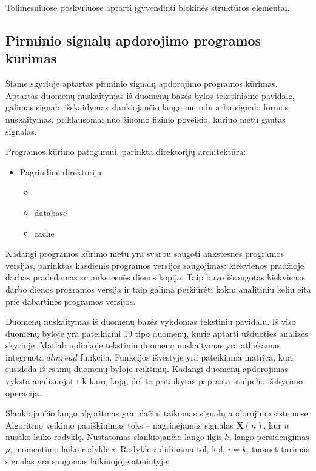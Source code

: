 \documentclass[]{vgtuef}
\begin{document}
Tolimesniuose poskyriuose aptarti įgyvendinti blokinės struktūros elementai.

\subsection{Pirminio signalų apdorojimo programos kūrimas}

Šiame skyriuje aptartas pirminio signalų apdorojimo programos kūrimas. Aptartas duomenų nuskaitymas iš duomenų bazės bylos tekstiniame pavidale, galimas signalo išskaidymas slankiojančio lango metodu arba signalo formos nuskaitymas, priklausomai nuo žinomo fizinio poveikio, kuriuo metu gautas signalas.

Programos kūrimo patogumui, parinkta direktorijų architektūra:

\begin{itemize}
\item Pagrindinė direktorija
  \begin{itemize}
  \item <programos versija, nurodyta datos formatu>
  \item database
  \item cache
  \end{itemize}
\end{itemize}

Kadangi programos kūrimo metu yra svarbu saugoti ankstesnes programos versijas, parinktas kasdienis programos versijos saugojimas: kiekvienos pradžioje darbas pradedamas su ankstesnės dienos kopija. Taip buvo išsaugotas kiekvienos darbo dienos programos versija ir taip galima peržiūrėti kokiu analitiniu keliu eita prie dabartinės programos versijos.



Duomenų nuskaitymas iš duomenų bazės vykdomas tekstiniu pavidalu. Iš viso duomenų byloje yra pateikiami 19 tipo duomenų, kurie aptarti užduoties analizės skyriuje. Matlab aplinkoje tekstiniu duomenų nuskaitymas yra atliekamas integruota $dlmread$ funkcija. Funkcijos išvestyje yra pateikiama matrica, kuri susideda iš esamų duomenų byloje reikšmių. Kadangi duomenų apdorojimas vyksta analizuojat tik kairę koją, dėl to pritaikytas paprasta stulpelio išskyrimo operacija.


Slankiojančio lango algoritmas yra plačiai taikomas signalų apdorojimo sistemose. Algoritmo veikimo paaiškinimas toks -- nagrinėjamas signalas $\mathbf{X}(n)$, kur $n$ nusako laiko rodyklę. Nustatomas slankiojančio lango ilgis $k$, lango persidengimas $p$, momentinio laiko rodyklė $i$. Rodyklė $i$ didinama tol, kol, $i=k$, tuomet turimas signalas yra saugomas laikinojoje atmintyje:
\end{document}
